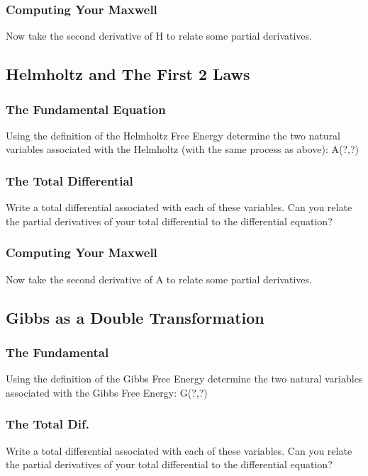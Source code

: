 \documentclass{article}
\begin{document}
\subsubsection{Computing Your Maxwell}
Now take the second derivative of H to relate some partial derivatives. 

\subsection{Helmholtz and The First 2 Laws}

\subsubsection{The Fundamental Equation}
Using the definition of the Helmholtz Free Energy determine the two natural variables associated with the Helmholtz (with the same process as above): A(?,?)

\subsubsection{The Total Differential}
Write a total differential associated with each of these variables.
Can you relate the partial derivatives of your total differential to the differential equation?

\subsubsection{Computing Your Maxwell}
Now take the second derivative of A to relate some partial derivatives.

\subsection{Gibbs as a Double Transformation}

\subsubsection{The Fundamental}
Using the definition of the Gibbs Free Energy determine the two natural variables associated with the Gibbs Free Energy: G(?,?)

\subsubsection{The Total Dif.}
Write a total differential associated with each of these variables.
Can you relate the partial derivatives of your total differential to the differential equation?
\end{document}
